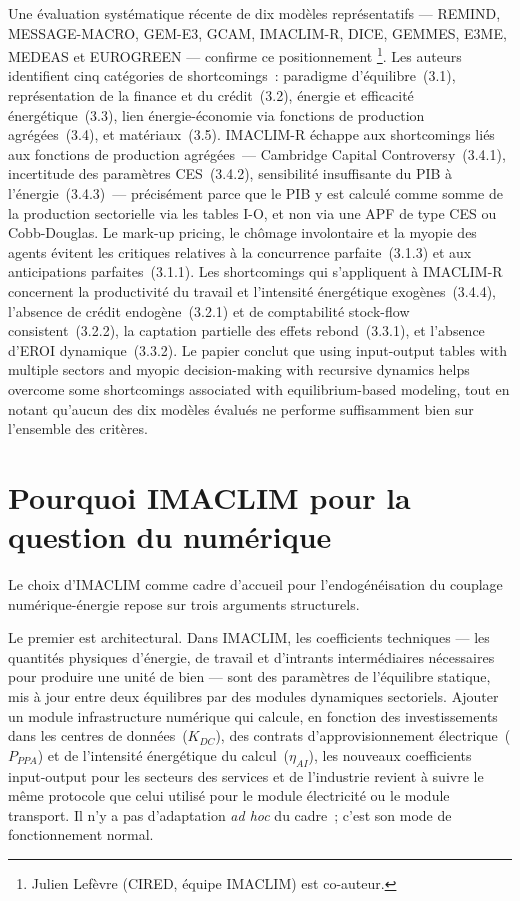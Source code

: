 Une évaluation systématique récente de dix modèles représentatifs --- REMIND, MESSAGE-MACRO, GEM-E3, GCAM, IMACLIM-R, DICE, GEMMES, E3ME, MEDEAS et EUROGREEN --- confirme ce positionnement \parencite{arias_modeling_2026}\footnote{Julien Lefèvre (CIRED, équipe IMACLIM) est co-auteur.}. Les auteurs identifient cinq catégories de shortcomings~: paradigme d'équilibre~(3.1), représentation de la finance et du crédit~(3.2), énergie et efficacité énergétique~(3.3), lien énergie-économie via fonctions de production agrégées~(3.4), et matériaux~(3.5). IMACLIM-R échappe aux shortcomings liés aux fonctions de production agrégées~--- Cambridge Capital Controversy~(3.4.1), incertitude des paramètres CES~(3.4.2), sensibilité insuffisante du PIB à l'énergie~(3.4.3)~--- précisément parce que le PIB y est calculé comme somme de la production sectorielle via les tables I-O, et non via une APF de type CES ou Cobb-Douglas. Le mark-up pricing, le chômage involontaire et la myopie des agents évitent les critiques relatives à la concurrence parfaite~(3.1.3) et aux anticipations parfaites~(3.1.1). Les shortcomings qui s'appliquent à IMACLIM-R concernent la productivité du travail et l'intensité énergétique exogènes~(3.4.4), l'absence de crédit endogène~(3.2.1) et de comptabilité stock-flow consistent~(3.2.2), la captation partielle des effets rebond~(3.3.1), et l'absence d'EROI dynamique~(3.3.2). Le papier conclut que \og using input-output tables with multiple sectors and myopic decision-making with recursive dynamics helps overcome some shortcomings associated with equilibrium-based modeling\fg{}, tout en notant qu'aucun des dix modèles évalués ne performe suffisamment bien sur l'ensemble des critères.

\section{Pourquoi IMACLIM pour la question du numérique}\label{sec:imaclim-numerique}

Le choix d'IMACLIM comme cadre d'accueil pour l'endogénéisation du couplage numérique-énergie repose sur trois arguments structurels.

Le premier est architectural. Dans IMACLIM, les coefficients techniques --- les quantités physiques d'énergie, de travail et d'intrants intermédiaires nécessaires pour produire une unité de bien --- sont des paramètres de l'équilibre statique, mis à jour entre deux équilibres par des modules dynamiques sectoriels. Ajouter un module \og infrastructure numérique\fg{} qui calcule, en fonction des investissements dans les centres de données~($K_{DC}$), des contrats d'approvisionnement électrique~($P_{PPA}$) et de l'intensité énergétique du calcul~($\eta_{AI}$), les nouveaux coefficients input-output pour les secteurs des services et de l'industrie revient à suivre le même protocole que celui utilisé pour le module électricité ou le module transport. Il n'y a pas d'adaptation \emph{ad hoc} du cadre~; c'est son mode de fonctionnement normal.

